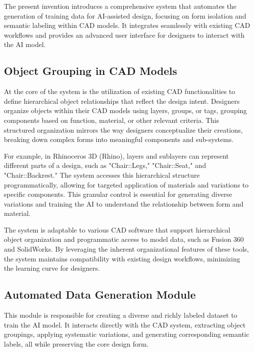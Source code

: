 \documentclass{article}
\begin{document}
The present invention introduces a comprehensive system that automates the generation of training data for AI-assisted design, focusing on form isolation and semantic labeling within CAD models. It integrates seamlessly with existing CAD workflows and provides an advanced user interface for designers to interact with the AI model.

\subsection{Object Grouping in CAD Models}

At the core of the system is the utilization of existing CAD functionalities to define hierarchical object relationships that reflect the design intent. Designers organize objects within their CAD models using layers, groups, or tags, grouping components based on function, material, or other relevant criteria. This structured organization mirrors the way designers conceptualize their creations, breaking down complex forms into meaningful components and sub-systems.

For example, in Rhinoceros 3D (Rhino), layers and sublayers can represent different parts of a design, such as "Chair::Legs," "Chair::Seat," and "Chair::Backrest." The system accesses this hierarchical structure programmatically, allowing for targeted application of materials and variations to specific components. This granular control is essential for generating diverse variations and training the AI to understand the relationship between form and material.

The system is adaptable to various CAD software that support hierarchical object organization and programmatic access to model data, such as Fusion 360 and SolidWorks. By leveraging the inherent organizational features of these tools, the system maintains compatibility with existing design workflows, minimizing the learning curve for designers.

\subsection{Automated Data Generation Module}

This module is responsible for creating a diverse and richly labeled dataset to train the AI model. It interacts directly with the CAD system, extracting object groupings, applying systematic variations, and generating corresponding semantic labels, all while preserving the core design form.
\end{document}
